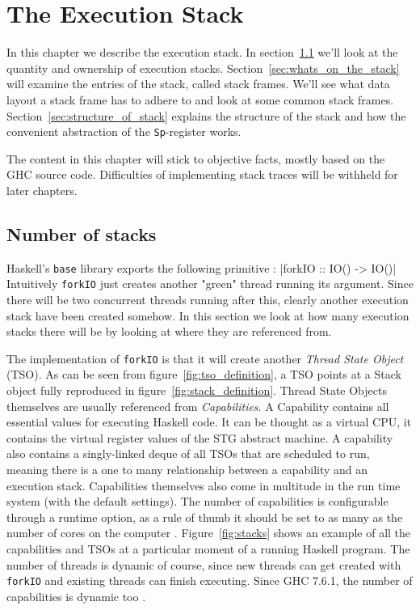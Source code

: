 \chapter{The Execution Stack} \label{chp:the_execution_stack}

In this chapter we describe the execution stack. In section~\ref{sec:number_of_stacks} we'll look at the quantity and ownership of
execution stacks. Section~\ref{sec:whats_on_the_stack} will examine the
entries of the stack, called stack frames. We'll see what data layout
a stack frame has to adhere to and look at some common stack
frames. Section~\ref{sec:structure_of_stack} explains the structure of
the stack and how the convenient abstraction of the \texttt{Sp}-register
works.

The content in this chapter will stick to objective facts, mostly based
on the GHC source code. Difficulties of implementing stack traces will
be withheld for later chapters.

\section{Number of stacks} \label{sec:number_of_stacks}

Haskell's \texttt{base} library exports the following primitive \cite{base_forkIO}:
|forkIO :: IO() -> IO()|
Intuitively \texttt{forkIO} just creates another "green" thread running its argument.
Since there will be two concurrent threads running after this, clearly
another execution stack have been created somehow. In this section we
look at how many execution stacks there will be by looking at
where they are referenced from.

The implementation of \texttt{forkIO} is
that it will create another \emph{Thread State Object} (TSO). As
can be seen from figure~\ref{fig:tso_definition}, a TSO points at a
Stack object fully reproduced in figure~\ref{fig:stack_definition}.
Thread State Objects themselves are usually referenced from \emph{Capabilities}.
A Capability contains all essential values for executing
Haskell code. It can be thought as a virtual CPU, it contains
the virtual register values of the STG abstract machine. A capability also contains
a singly-linked deque of all TSOs that are scheduled to run, meaning
there is a one to many relationship between a capability and an execution
stack. Capabilities themselves also come in multitude in the run time
system (with the default settings). The number of
capabilities is configurable through a runtime option, as a rule of
thumb it should be set to as many as the number of cores on the computer
\cite{commentary_capabilities}. Figure~\ref{fig:stacks} shows an example
of all the capabilities and TSOs at a particular moment of a running
Haskell program. The number of threads is dynamic of course, since
new threads can get created with \texttt{forkIO} and existing threads
can finish executing. Since GHC 7.6.1, the number of capabilities is
dynamic too \cite{haskell_org_release_7.6.1}.

